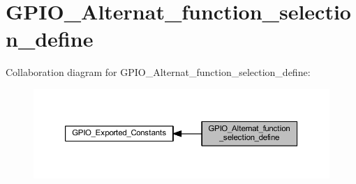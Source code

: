 \hypertarget{group___g_p_i_o___alternat__function__selection__define}{}\section{G\+P\+I\+O\+\_\+\+Alternat\+\_\+function\+\_\+selection\+\_\+define}
\label{group___g_p_i_o___alternat__function__selection__define}
Collaboration diagram for G\+P\+I\+O\+\_\+\+Alternat\+\_\+function\+\_\+selection\+\_\+define\+:\nopagebreak
\begin{figure}[H]
\begin{center}
\leavevmode
\includegraphics[width=350pt]{group___g_p_i_o___alternat__function__selection__define}
\end{center}
\end{figure}

